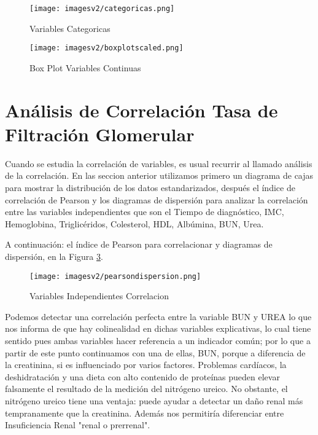 \documentclass[runningheads,a4paper]{llncs}
\begin{document}
\begin{figure}[!ht]
\centering
\texttt{[image: imagesv2/categoricas.png]}
\caption{Variables Categoricas }
\label{fig:categorico_descriptivo}
\end{figure}

\begin{figure}[!ht]
\centering
\texttt{[image: imagesv2/boxplotscaled.png]}
\caption{Box Plot Variables Continuas}
\label{fig:continuo_descriptivo}
\end{figure}



\section{Análisis  de  Correlación Tasa de Filtración Glomerular}

Cuando se estudia la correlación de variables, es usual recurrir al llamado análisis de la correlación. En las seccion anterior utilizamos primero un diagrama de cajas para mostrar la distribución de los datos estandarizados, después el índice de correlación de Pearson y los diagramas de dispersión para analizar la correlación entre las variables independientes que son el Tiempo de diagnóstico, IMC, Hemoglobina, Triglicéridos, Colesterol, HDL, Albúmina, BUN, Urea. 


A continuación: el índice de Pearson para correlacionar y diagramas de dispersión, en la Figura \ref{fig:independientes_correlacion}.


\begin{figure}[!ht]
\centering
\texttt{[image: imagesv2/pearsondispersion.png]}
\caption{Variables Independientes Correlacion}
\label{fig:independientes_correlacion}
\end{figure}

Podemos detectar una correlación perfecta entre la variable BUN y UREA lo que nos informa de que hay colinealidad en dichas variables explicativas, lo cual tiene sentido pues ambas variables hacer referencia a un indicador común; por lo que a partir de este punto continuamos con una de ellas, BUN, porque a diferencia de la creatinina, si es influenciado por varios factores. Problemas cardíacos, la deshidratación y una dieta con alto contenido de proteínas pueden elevar falsamente el resultado de la medición del nitrógeno ureico. No obstante, el nitrógeno ureico tiene una ventaja: puede ayudar a detectar un daño renal más tempranamente que la creatinina. Además nos permitiría diferenciar entre  Insuficiencia Renal "renal o prerrenal".
\end{document}

